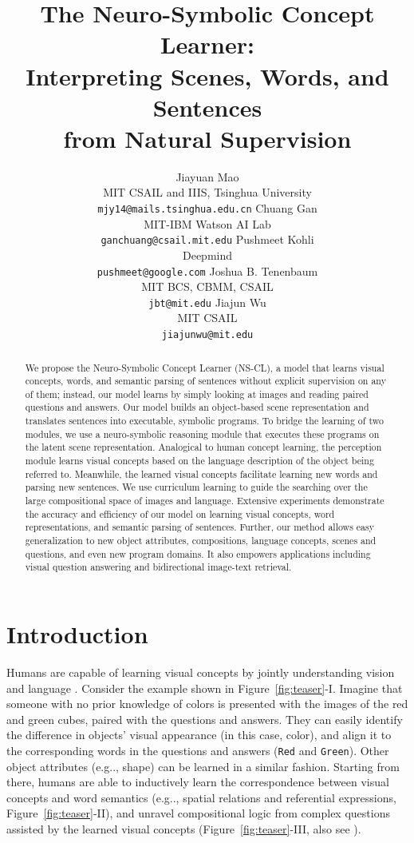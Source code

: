 \documentclass{article} %
\title{The Neuro-Symbolic Concept Learner:\\Interpreting Scenes, Words, and Sentences\\from Natural Supervision}
\author{%
Jiayuan Mao \\
MIT CSAIL and IIIS, Tsinghua University\\
\texttt{mjy14@mails.tsinghua.edu.cn}
\And
Chuang Gan\\
MIT-IBM Watson AI Lab\\
\texttt{ganchuang@csail.mit.edu}
\And
Pushmeet Kohli\\
Deepmind\\
\texttt{pushmeet@google.com}
\And
Joshua B. Tenenbaum\\
MIT BCS, CBMM, CSAIL\\
\texttt{jbt@mit.edu}
%
\And
Jiajun Wu\\
MIT CSAIL\\
\texttt{jiajunwu@mit.edu}
}
\makeatletter
\newcommand{\fig}[1]{Figure~\ref{#1}}
\DeclareRobustCommand\onedot{\futurelet\@let@token\@onedot}
\def\@onedot{\ifx\@let@token.\else.\null\fi\xspace}
\def\eg{e.g\onedot} \def\Eg{E.g\onedot}
\makeatother
\begin{document}
\maketitle

%
\begin{abstract}
We propose the Neuro-Symbolic Concept Learner (NS-CL), a model that learns visual concepts, words, and semantic parsing of sentences without explicit supervision on any of them; instead, our model learns by simply looking at images and reading paired questions and answers. Our model builds an object-based scene representation and translates sentences into executable, symbolic programs. To bridge the learning of two modules, we use a neuro-symbolic reasoning module that executes these programs on the latent scene representation. Analogical to human concept learning, the perception module learns visual concepts based on the language description of the object being referred to. Meanwhile, the learned visual concepts facilitate learning new words and parsing new sentences. We use curriculum learning to guide the searching over the large compositional space of images and language. Extensive experiments demonstrate the accuracy and efficiency of our model on learning visual concepts, word representations, and semantic parsing of sentences. Further, our method allows easy generalization to new object attributes, compositions, language concepts, scenes and questions, and even new program domains. It also empowers applications including visual question answering and bidirectional image-text retrieval. 
\end{abstract}

\section{Introduction}

%

%
Humans are capable of learning visual concepts by jointly understanding vision and language \citep{fazly2010probabilistic,chrupala2015learning,gauthier2018word}.
%
%
%
Consider the example shown in \fig{fig:teaser}-I. Imagine that someone with no prior knowledge of colors is presented with the images of the red and green cubes, paired with the questions and answers. They can easily identify the difference in objects' visual appearance (in this case, color), and align it to the corresponding words in the questions and answers (\texttt{Red} and \texttt{Green}). Other object attributes (\eg, shape) can be learned in a similar fashion. Starting from there, humans are able to inductively learn the correspondence between visual concepts and word semantics (\eg, spatial relations and referential expressions, \fig{fig:teaser}-II), and unravel compositional logic from complex questions assisted by the learned visual concepts (\fig{fig:teaser}-III, also see \cite{abend2017bootstrapping}). 
\end{document}
